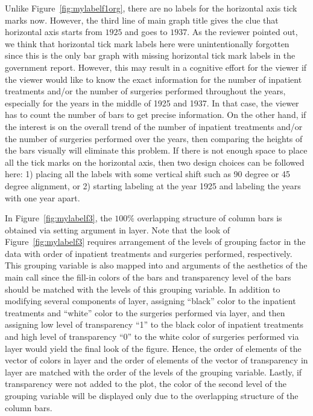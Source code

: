 Unlike Figure~\ref{fig:mylabelf1org}, there are no labels for the horizontal axis tick marks now. However, the third line of main graph title gives the clue that horizontal axis starts from $1925$ and goes to $1937$.  As the reviewer pointed out, we think that horizontal tick mark labels here were unintentionally forgotten since this is the only bar graph with missing horizontal tick mark labels in the government report. However, this may result in a cognitive effort for the viewer if the viewer would like to know the exact information for the number of inpatient treatments and/or the number of surgeries performed throughout the years, especially for the years in the middle of 1925 and 1937. In that case, the viewer has to count the number of bars to get precise information. On the other hand, if the interest is on the overall trend of the number of inpatient treatments and/or the number of surgeries performed over the years, then  comparing the heights of the bars visually will eliminate this problem. If there is not enough space to place all the tick marks on the horizontal axis, then two design choices can be followed here: 1) placing all the labels with some vertical shift such as 90 degree or 45 degree alignment, or 2) starting labeling at the year 1925 and labeling the years with one year apart.
	 	 
In Figure~\ref{fig:mylabelf3}, the $100\%$ overlapping structure of column bars is obtained via setting argument  in  layer. Note that the look of Figure~\ref{fig:mylabelf3} requires arrangement of the levels of grouping factor in the data with order of inpatient treatments and surgeries performed, respectively. This grouping variable  is also mapped into    and     arguments of the aesthetics of the main  call 
since the fill-in colors of the bars and transparency level of the bars should be matched with the levels of this grouping variable. In addition to modifying several components of  layer,  assigning \enquote{black} color to the inpatient treatments and \enquote{white} color to the surgeries performed via  layer, and then assigning low level of transparency \enquote{1} to the black color of inpatient treatments and high level of transparency \enquote{0} to the white color of surgeries performed via  layer would yield the final look of the figure. Hence, the order of elements of the vector of colors in  layer and the order of elements of the vector of transparency in  layer are matched with the order of the levels of the grouping variable. Lastly, if  transparency were not added to the plot, the color of the second level of the grouping variable will be displayed only due to the overlapping structure of the column bars.

